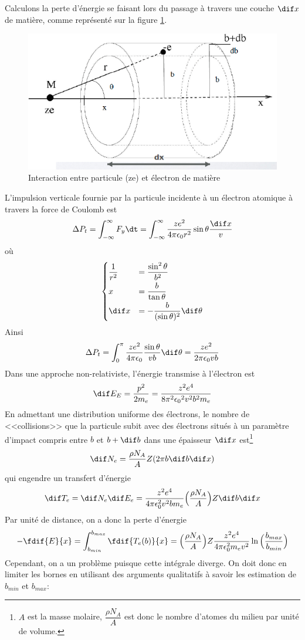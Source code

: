 Calculons la perte d'énergie se faisant lors du passage à travers une couche $\dif x$ de matière, comme représenté sur la figure \ref{fig:interraction_particule_matiere}.
\begin{figure}[ht]
    \centering
    \includegraphics[scale=0.60]{Images1/pertenrj.PNG}
    \caption{Interaction entre particule (ze) et électron de matière}
    \label{fig:interraction_particule_matiere}
\end{figure}
L'impulsion verticale fournie par la particule incidente à un électron atomique à travers la force de Coulomb est
\[
    \Delta P_t=\int_{-\infty}^\infty F_y \dt=\int_{-\infty}^\infty \dfrac{ze^2}{4\pi \epsilon_0 r^2} \sin{\theta}\dfrac{\dif x}{v}
\]
où
\[\begin{cases}
    \dfrac{1}{r^2} &= \dfrac{\sin^2\theta}{b^2} \\[2mm]
    x &= \dfrac{b}{\tan{\theta}} \\[2mm]
    \dif x &= -\dfrac{b}{(\sin{\theta})^2}\dif\theta
\end{cases}\]
Ainsi
\[
    \Delta P_t=\int_{0}^\pi \dfrac{ze^2}{4\pi \epsilon_0}\dfrac{\sin{\theta}}{vb}\dif\theta = \dfrac{ze^2}{2\pi \epsilon_0 vb}
\]
Dans une approche non-relativiste, l'énergie transmise à l'électron est
\[
    \dif E_E=\dfrac{p^2}{2m_e}=\dfrac{z^2e^4}{8\pi^2{\epsilon_0}^2v^2b^2m_e}
\]
En admettant une distribution uniforme des électrons, le nombre de <<collisions>> que la particule subit avec des électrons situés à un paramètre d'impact compris entre $b$ et $b+\dif b$ dans une épaisseur $\dif x$ est\footnote{$A$ est la masse molaire, $\dfrac{\rho N_A}{A}$ est donc le nombre d'atomes du milieu par unité de volume.}
\[
    \dif N_e=\dfrac{\rho N_A}{A}Z(2\pi b \dif b \dif x)
\]
qui engendre un transfert d'énergie
\[
    \dif T_e=\dif N_e\dif E_e=\dfrac{z^2e^4}{4\pi \epsilon_0^2v^2bm_e}\Big(\dfrac{\rho N_A}{A}\Big)Z \dif b \dif x
\]
Par unité de distance, on a donc la perte d'énergie
\[
    -\fdif{E}{x}=\int_{b_{min}}^{b_{max}} \fdif{T_e(b)}{x}=\Big(\dfrac{\rho N_A}{A}\Big)Z\dfrac{z^2e^4}{4\pi \epsilon_0^2m_ev^2}\ln{\Big(\dfrac{b_{max}}{b_{min}}\Big)}
\]
Cependant, on a un problème puisque cette intégrale diverge. On doit donc en limiter les bornes en utilisant des arguments qualitatifs à savoir les estimation de $b_{min}$ et $b_{max}$:


